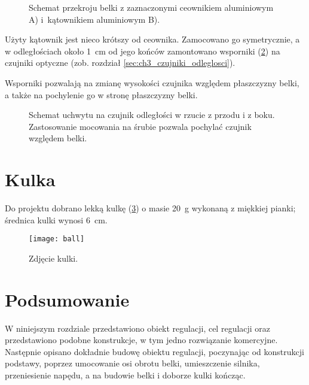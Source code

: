\begin{figure}[h]
	\centering
	
	\caption{Schemat przekroju belki z zaznaczonymi ceownikiem aluminiowym A) i~kątownikiem aluminiowym B).}
	\label{fig:przekroj_belki}
\end{figure}

Użyty kątownik jest nieco krótszy od ceownika. Zamocowano go symetrycznie, a w odległościach około \SI{1}{cm} od jego końców zamontowano wsporniki (\cref{fig:uchwyt_czujnika_odleglosci}) na czujniki optyczne (zob. rozdział \ref{sec:ch3_czujniki_odleglosci}).

Wsporniki pozwalają na zmianę wysokości czujnika względem płaszczyzny belki, a także na pochylenie go w stronę płaszczyzny belki.

\begin{figure}[h]
    \centering
    
    \caption{Schemat uchwytu na czujnik odległości w rzucie z przodu i z boku. Zastosowanie mocowania na śrubie pozwala pochylać czujnik względem belki.}
    \label{fig:uchwyt_czujnika_odleglosci}
\end{figure}

\section{Kulka}
\label{sec:ch2_kulka}

Do projektu dobrano lekką kulkę (\cref{fig:kulka}) o masie \SI{20}{g} wykonaną z miękkiej pianki; średnica kulki wynosi \SI{6}{cm}.

\begin{figure}[h]
    \centering
    \texttt{[image: ball]}
    \caption{Zdjęcie kulki.}
    \label{fig:kulka}
\end{figure}

\section{Podsumowanie}

W niniejszym rozdziale przedstawiono obiekt regulacji, cel regulacji oraz przedstawiono podobne konstrukcje, w tym jedno rozwiązanie komercyjne. Następnie opisano dokładnie budowę obiektu regulacji, poczynając od konstrukcji podstawy, poprzez umocowanie osi obrotu belki, umieszczenie silnika, przeniesienie napędu, a na budowie belki i doborze kulki kończąc.

